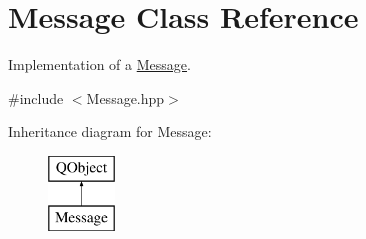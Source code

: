 \hypertarget{class_message}{}\section{Message Class Reference}
\label{class_message}


Implementation of a \hyperlink{class_message}{Message}.  




{\ttfamily \#include $<$Message.\+hpp$>$}

Inheritance diagram for Message\+:\begin{figure}[H]
\begin{center}
\leavevmode
\includegraphics[height=2.000000cm]{class_message}
\end{center}
\end{figure}
